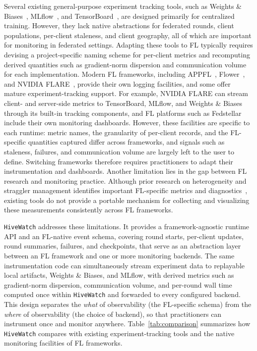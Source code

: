 \documentclass[preprint,12pt, a4paper]{elsarticle}
\newcommand{\rev}[1]{{\color{blue}#1}}
\newcommand{\rev}[1]{#1}
\begin{document}
Several existing general-purpose experiment tracking tools, such as Weights \& Biases~\cite{wandb}, MLflow~\cite{mlflow}, and TensorBoard~\cite{tensorboard}, are designed primarily for centralized training. However, they lack native abstractions for federated rounds, client populations, per-client staleness, and client geography, all of which are important for monitoring in federated settings. Adapting these tools to FL typically requires devising a project-specific naming scheme for per-client metrics and recomputing derived quantities such as \rev{gradient-norm dispersion} and communication volume for each implementation. Modern FL frameworks, including APPFL~\cite{ryu2022appfl,li2025advances}, Flower~\cite{beutel2020flower}, and NVIDIA FLARE~\cite{roth2022nvidia}, provide their own logging facilities, \rev{ and some offer mature experiment-tracking support. For example, NVIDIA FLARE can stream client- and server-side metrics to TensorBoard, MLflow, and Weights \& Biases through its built-in tracking components, and FL platforms such as Fedstellar~\cite{beltran2024fedstellar} include their own monitoring dashboards. However, these facilities are specific to each runtime: metric names, the granularity of per-client records, and the FL-specific quantities captured differ across frameworks, and signals such as staleness, failures, and communication volume are largely left to the user to define.} Switching frameworks therefore requires practitioners to \rev{adapt their instrumentation and dashboards.} Another limitation lies in the gap between FL research and monitoring practice. Although prior research on heterogeneity and straggler management identifies important FL-specific metrics and diagnostics~\rev{\cite{chen2024adaptive,chen2024robust,xie2019asynchronous,nguyen2022federated,li2024fedcompass}}, existing tools do not provide a portable mechanism for collecting and visualizing these measurements consistently across FL frameworks.

\texttt{HiveWatch} addresses these limitations. It provides a framework-agnostic runtime API and an FL-native event schema, covering round starts, per-client updates, round summaries, failures, and checkpoints, that serve as an abstraction layer between an FL framework and one or more monitoring backends. The same instrumentation code can simultaneously stream experiment data to replayable local artifacts, Weights \& Biases, and MLflow, with derived metrics such as \rev{gradient-norm dispersion}, communication volume, and per-round wall time computed once within \texttt{HiveWatch} and forwarded to every configured backend. This design separates the \emph{what} of observability (the FL-specific schema) from the \emph{where} of observability (the choice of backend), so that practitioners can instrument once and monitor anywhere. \rev{Table~\ref{tab:comparison} summarizes how \texttt{HiveWatch} compares with existing experiment-tracking tools and the native monitoring facilities of FL frameworks.}
\end{document}
